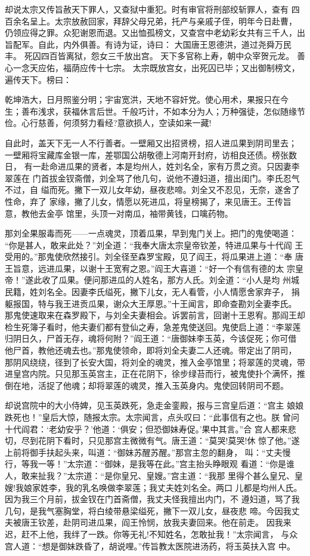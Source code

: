 却说太宗又传旨赦天下罪人，又查狱中重犯。时有审官将刑部绞斩罪人，查有
四百余名呈上。太宗放赦回家，拜辞父母兄弟，托产与亲戚子侄，明年今日赴曹，
仍领应得之罪。众犯谢恩而退。又出恤孤榜文，又查宫中老幼彩女共有三千人，出
旨配军。自此，内外俱善。有诗为证，诗曰：
大国唐王恩德洪，道过尧舜万民丰。
死囚四百皆离狱，怨女三千放出宫。
天下多官称上寿，朝中众宰贺元龙。
善心一念天应佑，福荫应传十七宗。
太宗既放宫女，出死囚已毕；又出御制榜文，遍传天下。榜曰：

乾坤浩大，日月照鉴分明；宇宙宽洪，天地不容奸党。使心用术，果报只在今
生；善布浅求，获福休言后世。千般巧计，不如本分为人；万种强徒，怎似随缘节
俭。心行慈善，何须努力看经?意欲损人，空读如来一藏!

自此时，盖天下无一人不行善者。一壁厢又出招贤榜，招人进瓜果到阴司里去；
一壁厢将宝藏库金银一库，差鄂国公胡敬德上河南开封府，访相良还债。榜张数日，
有一赴命进瓜果的贤者，本是均州人，姓刘名全，家有万贯之资。只因妻李翠莲在
门首拔金钗斋僧，刘全骂了他几句，说他不遵妇道，擅出闺门。李氏忍气不过，自
缢而死。撇下一双儿女年幼，昼夜悲啼。刘全又不忍见，无奈，遂舍了性命，弃了
家缘，撇了儿女，情愿以死进瓜，将皇榜揭了，来见唐王。王传旨意，教他去金亭
馆里，头顶一对南瓜，袖带黄钱，口噙药物。

那刘全果服毒而死——一点魂灵，顶着瓜果，早到鬼门关上。把门的鬼使喝道：
“你是甚人，敢来此处？”刘全道：“我奉大唐太宗皇帝钦差，特进瓜果与十代阎
王受用的。”那鬼使欣然接引。刘全径至森罗宝殿，见了阎王，将瓜果进上道：“奉
唐王旨意，远进瓜果，以谢十王宽宥之恩。”阎王大喜道：“好一个有信有德的太
宗皇帝！”遂此收了瓜果。便问那进瓜的人姓名，那方人氏。刘全道：“小人是均
州城民籍，姓刘名全。因妻李氏缢死，撇下儿女，无人看管，小人情愿舍家弃子，
捐躯报国，特与我王进贡瓜果，谢众大王厚恩。”十王闻言，即命查勘刘全妻李氏。
那鬼使速取来在森罗殿下，与刘全夫妻相会。诉罢前言，回谢十王恩宥。那阎王却
检生死簿子看时，他夫妻们都有登仙之寿，急差鬼使送回。鬼使启上道：“李翠莲
归阴日久，尸首无存，魂将何附？”阎王道：“唐御妹李玉英，今该促死；你可借
他尸首，教他还魂去也。”那鬼使领命，即将刘全夫妻二人还魂。带定出了阴司，
那阴风绕绕，径到了长安大国，将刘全的魂灵，推入金亭馆里；将翠莲的灵魂，带
进皇宫内院。只见那玉英宫主，正在花阴下，徐步绿苔而行，被鬼使扑个满怀，推
倒在地，活捉了他魂；却将翠莲的魂灵，推入玉英身内。鬼使回转阴司不题。

却说宫院中的大小侍婢，见玉英跌死，急走金銮殿，报与三宫皇后道：“宫主
娘娘跌死也！”皇后大惊，随报太宗。太宗闻言，点头叹曰：“此事信有之也。朕
曾问十代阎君：‘老幼安乎？’他道：‘俱安；但恐御妹寿促。’果中其言。”合
宫人都来悲切，尽到花阴下看时，只见那宫主微微有气。唐王道：“莫哭!莫哭!休
惊了他。”遂上前将御手扶起头来，叫道：“御妹苏醒苏醒。”那宫主忽的翻身，
叫：“丈夫慢行，等我一等！”太宗道：“御妹，是我等在此。”宫主抬头睁眼观
看道：“你是谁人，敢来扯我？”太宗道：“是你皇兄、皇嫂。”宫主道：“我那
里得个甚么皇兄、皇嫂!我娘家姓李，我的乳名唤做李翠莲；我丈夫姓刘名全。两口
儿都是均州人氏。因为我三个月前，拔金钗在门首斋僧，我丈夫怪我擅出内门，不
遵妇道，骂了我几句，是我气塞胸堂，将白绫带悬梁缢死，撇下一双儿女，昼夜悲
啼。今因我丈夫被唐王钦差，赴阴司进瓜果，阎王怜悯，放我夫妻回来。他在前走。
因我来迟，赶不上他，我绊了一跌。你等无礼!不知姓名，怎敢扯我！”太宗闻言，
与众宫人道：“想是御妹跌昏了，胡说哩。”传旨教太医院进汤药，将玉英扶入宫
中。

